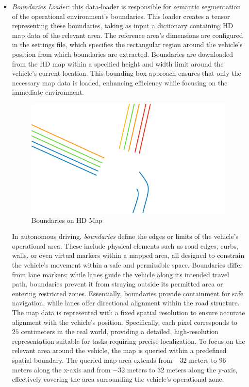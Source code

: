 \begin{itemize}
    \item \textit{Boundaries Loader}: this data-loader is responsible for semantic segmentation of the operational environment’s boundaries. This loader creates a tensor representing these boundaries, taking as input a dictionary containing HD map data of the relevant area. The reference area’s dimensions are configured in the settings file, which specifies the rectangular region around the vehicle’s position from which boundaries are extracted.
    Boundaries are downloaded from the HD map within a specified height and width limit around the vehicle's current location. This bounding box approach ensures that only the necessary map data is loaded, enhancing efficiency while focusing on the immediate environment.
    \begin{figure}[H]
        \centering
        \includegraphics[width=0.75\linewidth]{LateX//figs/mappaHD.pdf}
        \caption{Boundaries on HD Map}
        \label{fig:hd-map-boundaries}
    \end{figure}
    In autonomous driving, \textit{boundaries} define the edges or limits of the vehicle's operational area. These include physical elements such as road edges, curbs, walls, or even virtual markers within a mapped area, all designed to constrain the vehicle’s movement within a safe and permissible space. Boundaries differ from lane markers: while lanes guide the vehicle along its intended travel path, boundaries prevent it from straying outside its permitted area or entering restricted zones. Essentially, boundaries provide containment for safe navigation, while lanes offer directional alignment within the road structure.
    The map data is represented with a fixed spatial resolution to ensure accurate alignment with the vehicle’s position. Specifically, each pixel corresponds to $25$ centimeters in the real world, providing a detailed, high-resolution representation suitable for tasks requiring precise localization. 
    To focus on the relevant area around the vehicle, the map is queried within a predefined spatial boundary. The queried map area extends from $-32$ meters to $96$ meters along the x-axis and from $-32$ meters to $32$ meters along the y-axis, effectively covering the area surrounding the vehicle’s operational zone.

\end{itemize}

